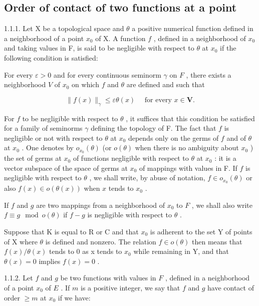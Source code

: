 \subsection{Order of contact of two functions at a point}

1.1.1. Let X be a topological space and \(\theta\) a positive numerical function defined in a neighborhood of a point \(x_0\) of X. A function \(f\) , defined in a neighborhood of \(x_0\) and taking values in F, is said to be negligible with respect to \(\theta\) at \(x_0\) if the following condition is satisfied:

For every \(\varepsilon > 0\) and for every continuous seminorm \(\gamma\) on \(F\) , there exists a neighborhood \(V\) of \(x_0\) on which \(f\) and \(\theta\) are defined and such that

\[
\| f (x) \| _ {\gamma} \leqslant \varepsilon \theta (x) \quad \text { for   every } x \in \mathbf {V}.
\]

For \(f\) to be negligible with respect to \(\theta\) , it suffices that this condition be satisfied for a family of seminorms \(\gamma\) defining the topology of F. The fact that \(f\) is negligible or not with respect to \(\theta\) at \(x_{0}\) depends only on the germs of \(f\) and of \(\theta\) at \(x_{0}\) . One denotes by \(o_{x_{0}}(\theta)\) (or \(o(\theta)\) when there is no ambiguity about \(x_{0}\) ) the set of germs at \(x_{0}\) of functions negligible with respect to \(\theta\) at \(x_{0}\) : it is a vector subspace of the space of germs at \(x_{0}\) of mappings with values in F. If \(f\) is negligible with respect to \(\theta\) , we shall write, by abuse of notation, \(f \in o_{x_{0}}(\theta)\) or also \(f(x) \in o(\theta(x))\) when \(x\) tends to \(x_{0}\) .

If \(f\) and \(g\) are two mappings from a neighborhood of \(x_{0}\) to \(F\) , we shall also write \(f \equiv g \mod o(\theta)\) if \(f - g\) is negligible with respect to \(\theta\) .

Suppose that K is equal to R or C and that \(x_{0}\) is adherent to the set Y of points of X where \(\theta\) is defined and nonzero. The relation \(f \in o(\theta)\) then means that \(f(x)/\theta(x)\) tends to 0 as x tends to \(x_{0}\) while remaining in Y, and that \(\theta(x) = 0\) implies \(f(x) = 0\) .

1.1.2. Let \(f\) and \(g\) be two functions with values in \(F\) , defined in a neighborhood of a point \(x_0\) of \(E\) . If \(m\) is a positive integer, we say that \(f\) and \(g\) have contact of order \(\geqslant m\) at \(x_0\) if we have:

